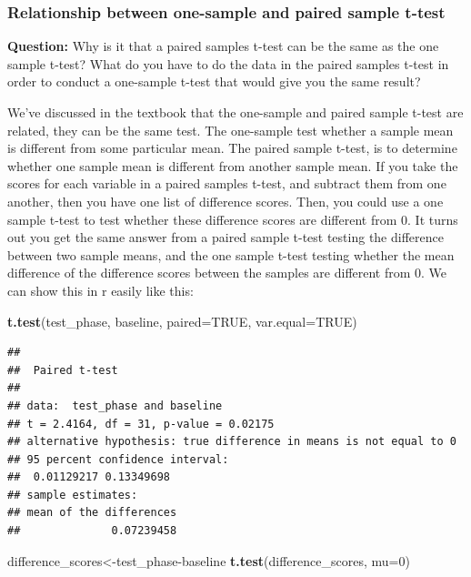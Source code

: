 \documentclass[]{book}
\newenvironment{Shaded}{\begin{snugshade}}{\end{snugshade}}
\newcommand{\KeywordTok}[1]{\textcolor[rgb]{0.13,0.29,0.53}{\textbf{{#1}}}}
\newcommand{\DataTypeTok}[1]{\textcolor[rgb]{0.13,0.29,0.53}{{#1}}}
\newcommand{\DecValTok}[1]{\textcolor[rgb]{0.00,0.00,0.81}{{#1}}}
\newcommand{\OtherTok}[1]{\textcolor[rgb]{0.56,0.35,0.01}{{#1}}}
\newcommand{\NormalTok}[1]{{#1}}
\theoremstyle{definition}
\theoremstyle{definition}
\theoremstyle{definition}
\theoremstyle{remark}
\begin{document}
\subsubsection{Relationship between one-sample and paired sample
t-test}\label{relationship-between-one-sample-and-paired-sample-t-test}

\textbf{Question:} Why is it that a paired samples t-test can be the
same as the one sample t-test? What do you have to do the data in the
paired samples t-test in order to conduct a one-sample t-test that would
give you the same result?

We've discussed in the textbook that the one-sample and paired sample
t-test are related, they can be the same test. The one-sample test
whether a sample mean is different from some particular mean. The paired
sample t-test, is to determine whether one sample mean is different from
another sample mean. If you take the scores for each variable in a
paired samples t-test, and subtract them from one another, then you have
one list of difference scores. Then, you could use a one sample t-test
to test whether these difference scores are different from 0. It turns
out you get the same answer from a paired sample t-test testing the
difference between two sample means, and the one sample t-test testing
whether the mean difference of the difference scores between the samples
are different from 0. We can show this in r easily like this:

\begin{Shaded}
\begin{Highlighting}[]
\KeywordTok{t.test}\NormalTok{(test_phase, baseline, }\DataTypeTok{paired=}\OtherTok{TRUE}\NormalTok{, }\DataTypeTok{var.equal=}\OtherTok{TRUE}\NormalTok{)}
\end{Highlighting}
\end{Shaded}

\begin{verbatim}
## 
##  Paired t-test
## 
## data:  test_phase and baseline
## t = 2.4164, df = 31, p-value = 0.02175
## alternative hypothesis: true difference in means is not equal to 0
## 95 percent confidence interval:
##  0.01129217 0.13349698
## sample estimates:
## mean of the differences 
##              0.07239458
\end{verbatim}

\begin{Shaded}
\begin{Highlighting}[]
\NormalTok{difference_scores<-test_phase-baseline}
\KeywordTok{t.test}\NormalTok{(difference_scores, }\DataTypeTok{mu=}\DecValTok{0}\NormalTok{)}
\end{Highlighting}
\end{Shaded}
\end{document}
